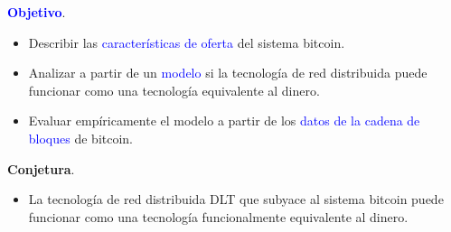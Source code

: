 \begin{frame}{}

    \textcolor{blue}{\textbf{Objetivo}}.\\
    \vspace{5mm}
    \begin{itemize}
        \setlength\itemsep{1em}
        
        \item[] Describir las \textcolor{blue}{características de oferta} del sistema bitcoin.\\ 
        
        \item[] Analizar a partir de un \textcolor{blue}{modelo} si la tecnología de red distribuida puede funcionar como una tecnología equivalente al dinero.\\
        \item[] Evaluar empíricamente el modelo a partir de los \textcolor{blue}{datos de la cadena de bloques} de bitcoin.
    \end{itemize}
 
    \vspace{5mm}
    \textcolor{dgreen}{\textbf{Conjetura}}. 
    \vspace{5mm}
    \begin{itemize}
    \item[] La tecnología de red distribuida DLT que subyace al sistema bitcoin puede funcionar como una \textcolor{dgreen}{tecnología funcionalmente equivalente al dinero}.
    \end{itemize}


    
\end{frame}
